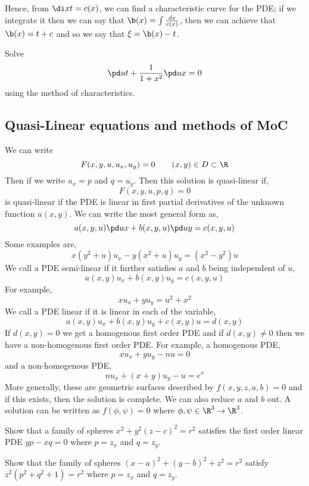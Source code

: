 Hence, from $\di x t = c(x)$, we can find a characteristic curve for the PDE; if we integrate it then we can say that $\b(x) = \int \frac{dx}{c(x)}$, then we can achieve that $\b(x) = t + c$ and so we say that $\xi = \b(x) - t$.

\begin{eg}
  Solve
  $$ \pd u t + \frac{1}{1 + x^2}\pd u x = 0 $$
  using the method of characteristics.
\end{eg}

\subsection{Quasi-Linear equations and methods of MoC}
We can write
$$ F(x, y , u, u_x, u_y) = 0 \qquad (x, y) \in D \subset \R$$
Then if we write $u_x = p$ and $q = u_y$. Then this solution is quasi-linear if,
$$ F(x, y, u, p, q) = 0 $$
is quasi-linear if the PDE is linear in first partial derivatives of the unknown function $u(x, y)$. We can write the most general form as,
$$ a(x, y, u)\pd u x + b(x, y, u)\pd u y = c(x, y, u) $$
Some examples are,
$$ x(y^2 + u)u_x - y(x^2 + u)u_y = (x^2 - y^2)u $$
We call a PDE semi-linear if it further satisfies $a$ and $b$ being independent of $u$,
$$ a(x, y)u_x + b(x, y)u_y = c(x, y, u) $$
For example,
$$ xu_x + yu_y = u^2 + x^2 $$
We call a PDE linear if it is linear in each of the variable,
$$ a(x, y)u_x + b(x, y)u_y + c(x, y)u = d(x, y) $$
If $d(x, y) = 0$ we get a homogenous first order PDE and if $d(x, y) \ne 0$ then we have a non-homogenous first order PDE. For example, a homogenous PDE,
$$ xu_x + yu_y - nu = 0 $$
and a non-homogenous PDE,
$$ nu_x + (x + y)u_y - u = e^x $$
More generally, these are geometric surfaces described by $f(x, y, z, a, b) = 0$ and if this exists, then the solution is complete. We can also reduce $a$ and $b$ out. A solution can be written as $f(\phi, \psi) = 0$ where $\phi, \psi \in \R^3 \to \R^3$.

\begin{eg}
  Show that a family of spheres $x^2 + y^2 (z - c)^2 = r^2$ satisfies the first order linear PDE $yp - xq = 0$ where $p = z_x$ and $q = z_y$.
\end{eg}

\begin{exercise}
  Show that the family of spheres $(x - a)^2 + (y - b)^2 + z^2 = r^2$ satisfy $z^2(p^2 + q^2 + 1) = r^2$ where $p = z_x$ and $q = z_y$.
\end{exercise}

